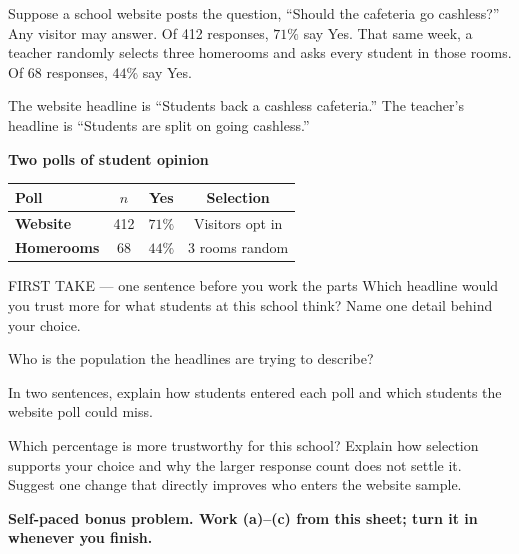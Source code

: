 \documentclass[14pt]{extarticle}
\begin{document}
\pagestyle{empty}


\noindent\begin{minipage}[t]{0.57\linewidth}
\vspace{0pt}
Suppose a school website posts the question, ``Should the cafeteria go cashless?'' Any visitor may answer. Of 412 responses, $71\%$ say Yes. That same week, a teacher randomly selects three homerooms and asks every student in those rooms. Of 68 responses, $44\%$ say Yes.\par\smallskip The website headline is ``Students back a cashless cafeteria.'' The teacher's headline is ``Students are split on going cashless.''\par
\end{minipage}\hfill
\begin{minipage}[t]{0.40\linewidth}
\vspace{0pt}
\begin{center}
\textbf{Two polls of student opinion}\par\smallskip
\begin{tabular}{|l|c|c|c|}
\hline
\textbf{Poll} & \textbf{$n$} & \textbf{Yes} & \textbf{Selection} \\ \hline
\textbf{Website} & 412 & $71\%$ & Visitors opt in \\ \hline
\textbf{Homerooms} & 68 & $44\%$ & 3 rooms random \\ \hline
\end{tabular}
\end{center}
\end{minipage}

\begin{firsttakebox}{FIRST TAKE --- one sentence before you work the parts}
Which headline would you trust more for what students at this school think? Name one detail behind your choice.
\end{firsttakebox}

\begin{description}[leftmargin=1.15in, labelwidth=1in, itemsep=2pt, topsep=2pt]
  \item[\dokbadge{1}~(a)] Who is the population the headlines are trying to describe?
  \item[\dokbadge{2}~(b)] In two sentences, explain how students entered each poll and which students the website poll could miss.
  \item[\dokbadge{3}~(c)] Which percentage is more trustworthy for this school? Explain how selection supports your choice and why the larger response count does not settle it. Suggest one change that directly improves who enters the website sample.
\end{description}

\vfill
\textbf{Self-paced bonus problem. Work (a)--(c) from this sheet; turn it in whenever you finish.}
\end{document}

